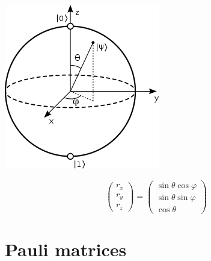 \documentclass[a4paper,10pt]{scrartcl}
\begin{document}
\begin{minipage}{\linewidth}

\begin{minipage}{0.5\linewidth}\center
\includegraphics[scale=0.5]{img/bloch.png}
\end{minipage}
\begin{minipage}{0.5\linewidth}\center
\[ \begin{pmatrix}
r_x \\
r_y \\
r_z
\end{pmatrix}
=
\begin{pmatrix}
\sin \theta \cos \varphi \\
\sin \theta \sin \varphi \\
\cos \theta
\end{pmatrix}
\]
\end{minipage}
\end{minipage}



\section*{Pauli matrices}
\end{document}
